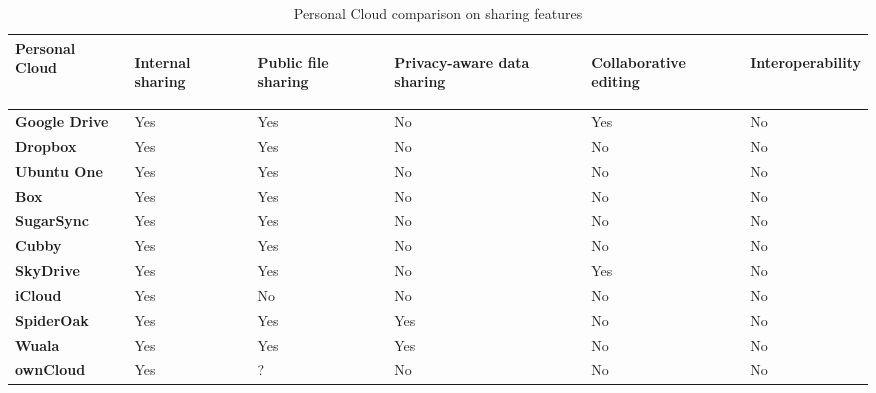 {
\def\arraystretch{1.5}

\begin{table}
\begin{center}
    \begin{tabular}{ | p{3.3cm} | p{1.5cm} | p{1.5cm} | p{1.5cm} | p{1.5cm} | p{1.5cm} | }
    \hline
    \rowcolor[gray]{0.8}

	\textbf{Personal Cloud} &
	\begin{sideways}\textbf{Internal sharing}\end{sideways} &
	\begin{sideways}\textbf{Public file sharing}\end{sideways} &
	\begin{sideways}\textbf{Privacy-aware data sharing}\end{sideways} & 
	\begin{sideways}\textbf{Collaborative editing}\end{sideways} & 
	\begin{sideways}\textbf{Interoperability}\end{sideways} \\ \hline

	\textbf{Google Drive} &
	Yes &
	Yes &
	No &
	Yes &
	No \\ \hline

	\textbf{Dropbox} &
	Yes &
	Yes &
	No &
	No &
	No \\ \hline
	
	\textbf{Ubuntu One} &
	Yes &
	Yes &
	No &
	No &
	No \\ \hline
	
	\textbf{Box} &
	Yes &
	Yes &
	No &
	No &
	No \\ \hline
	
	\textbf{SugarSync} & 
	Yes &
	Yes &
	No &
	No &
	No \\ \hline
	
	\textbf{Cubby} &
	Yes &
	Yes &
	No &
	No &
	No \\ \hline
	
	\textbf{SkyDrive} & 
	Yes &
	Yes &
	No &
	Yes &
	No \\ \hline

	\textbf{iCloud} &
	Yes &
	No &
	No &
	No &
	No \\ \hline
	
	\textbf{SpiderOak} & 
	Yes &
	Yes &
	Yes &
	No &
	No \\ \hline

	\textbf{Wuala} &
	Yes &
	Yes &
	Yes &
	No &
	No \\ \hline
	
	\textbf{ownCloud} &
	Yes &
	? &
	No &
	No &
	No \\ \hline

    \end{tabular}
    \caption{Personal Cloud comparison on sharing features}
    \label{tab:pc_sharing}
\end{center}
\end{table}
}



